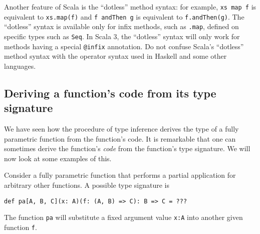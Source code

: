 Another feature of Scala is the ``dotless'' method syntax: for example,
\lstinline!xs map f! is
equivalent to \lstinline!xs.map(f)!
and \lstinline!f andThen g!
is equivalent to \lstinline!f.andThen(g)!.
The ``dotless'' syntax is available only for infix methods, such
as \lstinline!.map!, defined
on specific types such as \lstinline!Seq!.
In Scala 3, the ``dotless'' syntax will only work for methods having
a special \lstinline!@infix!
annotation. Do not confuse Scala's ``dotless'' method syntax with
the operator syntax used in Haskell and some other languages.

\subsection{Deriving a function's code from its type signature\label{subsec:Deriving-a-function's}}

We have seen how the procedure of type inference
derives the type of a fully parametric function from the function's
code. It is remarkable that one can sometimes derive the function's
\emph{code} from the function's type signature. We will now look at
some examples of this.

Consider a fully parametric function that performs a partial application
for arbitrary other functions. A possible type signature is
\begin{lstlisting}
def pa[A, B, C](x: A)(f: (A, B) => C): B => C = ???
\end{lstlisting}
The function \lstinline!pa!
will substitute a fixed argument value \lstinline!x:A!
into another given function \lstinline!f!. 

